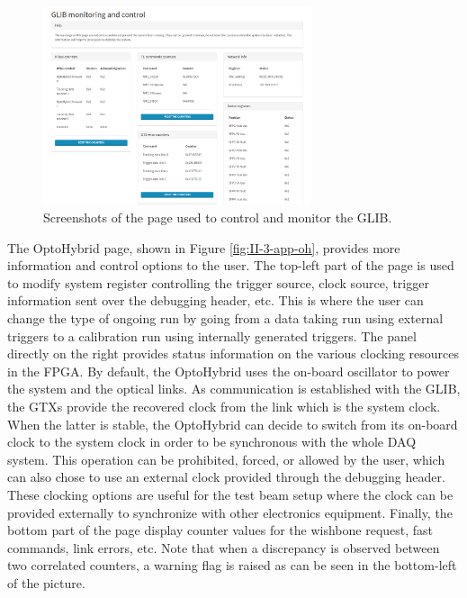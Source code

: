       \begin{figure}[h!]
        \centering
        \includegraphics[width=0.7\textwidth]{img/II-3-test-beam/app-glib.png}
        \caption{Screenshots of the page used to control and monitor the GLIB.}
        \label{fig:II-3-app-glib}
      \end{figure}

      The OptoHybrid page, shown in Figure \ref{fig:II-3-app-oh}, provides more information and control options to the user. The top-left part of the page is used to modify system register controlling the trigger source, clock source, trigger information sent over the debugging header, etc. This is where the user can change the type of ongoing run by going from a data taking run using external triggers to a calibration run using internally generated triggers. The panel directly on the right provides status information on the various clocking resources in the FPGA. By default, the OptoHybrid uses the on-board oscillator to power the system and the optical links. As communication is established with the GLIB, the GTXs provide the recovered clock from the link which is the system clock. When the latter is stable, the OptoHybrid can decide to switch from its on-board clock to the system clock in order to be synchronous with the whole DAQ system. This operation can be prohibited, forced, or allowed by the user, which can also chose to use an external clock provided through the debugging header. These clocking options are useful for the test beam setup where the clock can be provided externally to synchronize with other electronics equipment. Finally, the bottom part of the page display counter values for the wishbone request, fast commands, link errors, etc. Note that when a discrepancy is observed between two correlated counters, a warning flag is raised as can be seen in the bottom-left of the picture. \\

